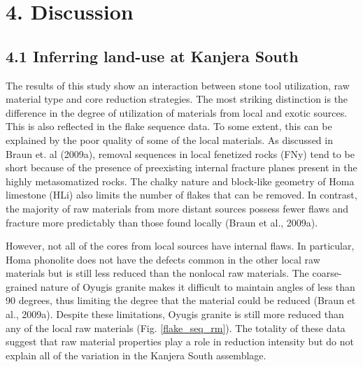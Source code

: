 \documentclass[]{elsarticle} %
\begin{document}
\hypertarget{discussion}{%
\section{4. Discussion}\label{discussion}}

\hypertarget{inferring-land-use-at-kanjera-south}{%
\subsection{4.1 Inferring land-use at Kanjera
South}\label{inferring-land-use-at-kanjera-south}}

The results of this study show an interaction between stone tool
utilization, raw material type and core reduction strategies. The most
striking distinction is the difference in the degree of utilization of
materials from local and exotic sources. This is also reflected in the
flake sequence data. To some extent, this can be explained by the poor
quality of some of the local materials. As discussed in Braun et. al
(2009a), removal sequences in local fenetized rocks (FNy) tend to be
short because of the presence of preexisting internal fracture planes
present in the highly metasomatized rocks. The chalky nature and
block-like geometry of Homa limestone (HLi) also limits the number of
flakes that can be removed. In contrast, the majority of raw materials
from more distant sources possess fewer flaws and fracture more
predictably than those found locally (Braun et al., 2009a).

However, not all of the cores from local sources have internal flaws. In
particular, Homa phonolite does not have the defects common in the other
local raw materials but is still less reduced than the nonlocal raw
materials. The coarse-grained nature of Oyugis granite makes it
difficult to maintain angles of less than 90 degrees, thus limiting the
degree that the material could be reduced (Braun et al., 2009a). Despite
these limitations, Oyugis granite is still more reduced than any of the
local raw materials (Fig. \ref{flake_seq_rm}). The totality of these
data suggest that raw material properties play a role in reduction
intensity but do not explain all of the variation in the Kanjera South
assemblage.
\end{document}
